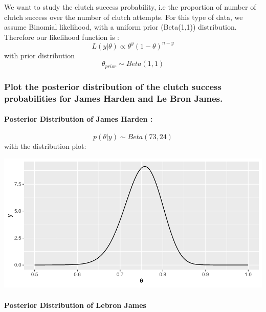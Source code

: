 \documentclass[
]{article}
\begin{document}
We want to study the clutch success probability, i.e the proportion of
number of clutch success over the number of clutch attempts. For this
type of data, we assume Binomial likelihood, with a uniform prior
(Beta(1,1)) distribution. Therefore our likelihood function is :
\[L(y|\theta) \propto \theta^y (1-\theta)^{n-y} \] with prior
distribution \[\theta_{prior} \sim Beta(1,1)\]

\hypertarget{plot-the-posterior-distribution-of-the-clutch-success-probabilities-for-james-harden-and-le-bron-james.}{%
\subsubsection{Plot the posterior distribution of the clutch success
probabilities for James Harden and Le Bron
James.}\label{plot-the-posterior-distribution-of-the-clutch-success-probabilities-for-james-harden-and-le-bron-james.}}

\hypertarget{posterior-distribution-of-james-harden}{%
\paragraph{Posterior Distribution of James Harden
:}\label{posterior-distribution-of-james-harden}}

\[p(\theta|y) \sim Beta(73, 24) \] with the distribution plot:

\begin{flushleft}\includegraphics{homework_1_files/figure-latex/unnamed-chunk-2-1} \end{flushleft}

\hypertarget{posterior-distribution-of-lebron-james}{%
\paragraph{Posterior Distribution of Lebron
James}\label{posterior-distribution-of-lebron-james}}
\end{document}
